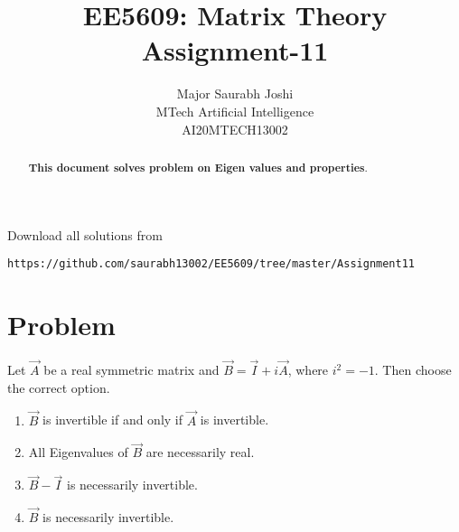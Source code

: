 \documentclass[journal,12pt,twocolumn]{IEEEtran}
\begin{document}
     \def\rightbox#1{\makebox[0in][r]{#1}}
     \def\centbox#1{\makebox[0in]{#1}}
     \def\topbox#1{\raisebox{-\baselineskip}[0in][0in]{#1}}
     \def\midbox#1{\raisebox{-0.5\baselineskip}[0in][0in]{#1}}
\vspace{3cm}
\onecolumn
\title{EE5609: Matrix Theory\\
          Assignment-11\\}
\author{Major Saurabh Joshi\\MTech Artificial Intelligence\\AI20MTECH13002 }
\maketitle
\bigskip
\renewcommand{\thefigure}{\theenumi}
\renewcommand{\thetable}{\theenumi}
\begin{abstract}
\small\textbf{This document solves problem on Eigen values and properties}.
\end{abstract}
Download all solutions from 
\begin{lstlisting}
https://github.com/saurabh13002/EE5609/tree/master/Assignment11
\end{lstlisting}
\section{\textbf{Problem}}
Let $\vec{A}$ be a real symmetric matrix and  $\vec{B}=\vec{I}+i\vec{A}$, where $i^2=-1$. Then choose the correct option.\\
\begin{enumerate}
	\item  $\vec{B}$ is invertible if and only if $\vec{A}$ is invertible.\\
	\item All Eigenvalues of $\vec{B}$ are necessarily real.\\
	\item $\vec{B}-\vec{I}$ is necessarily invertible.\\
	\item $\vec{B}$ is necessarily invertible.\\
\end{enumerate}
\end{document}
